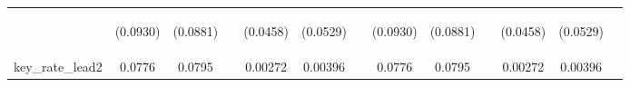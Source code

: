 \documentclass[]{article}
\begin{document}
\begin{center}
\begin{tabular}{lcccccccccccc}
\vspace{4pt} & \begin{footnotesize}(0.0930)\end{footnotesize} & \begin{footnotesize}(0.0881)\end{footnotesize} & \begin{footnotesize}\end{footnotesize} & \begin{footnotesize}(0.0458)\end{footnotesize} & \begin{footnotesize}(0.0529)\end{footnotesize} & \begin{footnotesize}\end{footnotesize} & \begin{footnotesize}(0.0930)\end{footnotesize} & \begin{footnotesize}(0.0881)\end{footnotesize} & \begin{footnotesize}\end{footnotesize} & \begin{footnotesize}(0.0458)\end{footnotesize} & \begin{footnotesize}(0.0529)\end{footnotesize} & \begin{footnotesize}\end{footnotesize} \\
key\_rate\_lead2 & 0.0776 & 0.0795 &  & 0.00272 & 0.00396 &  & 0.0776 & 0.0795 &  & 0.00272 & 0.00396 &  \\

\end{tabular}
\end{center}
\end{document}
